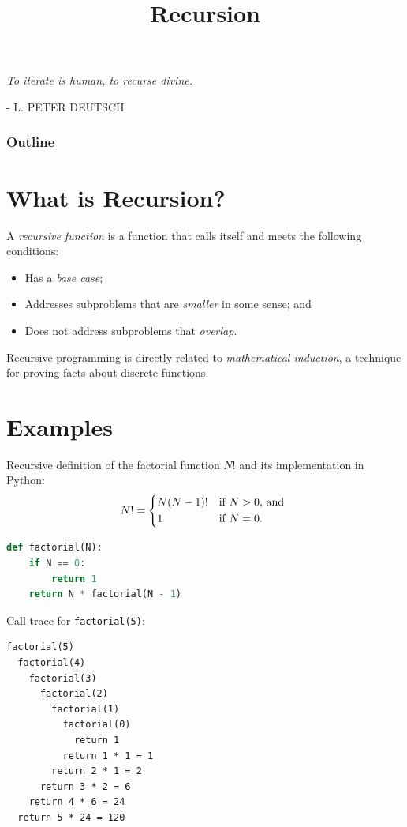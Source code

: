 \documentclass[8pt,a4paper,compress,handout]{beamer}
\title{Recursion}
\date{}
\begin{document}
\begin{frame}
\hfill
\begin{minipage}{150pt}
\begin{flushright}
\tiny \emph{To iterate is human, to recurse divine.}

\smallskip

- L. PETER DEUTSCH
\end{flushright}
\end{minipage}
\vfill
\titlepage
\end{frame}

\begin{frame}
\frametitle{Outline}
\tableofcontents
\end{frame}

\section{What is Recursion?}
\begin{frame}[fragile]
A \emph{recursive function} is a function that calls itself and meets the following conditions:
\begin{itemize}
\item Has a \emph{base case}; 
\item Addresses subproblems that are \emph{smaller} in some sense; and
\item Does not address subproblems that \emph{overlap}.
\end{itemize}

\bigskip

Recursive programming is directly related to \emph{mathematical induction}, a technique for proving facts about discrete functions.
\end{frame}

\section{Examples}
\begin{frame}[fragile]
Recursive definition of the factorial function $N!$ and its implementation in Python: 
\[
N! = \begin{dcases*}
N(N-1)! & if $N > 0$, and \\
1       & if $N=0$.
\end{dcases*}
\]

\begin{lstlisting}[language=Python]
def factorial(N):
    if N == 0:
        return 1
    return N * factorial(N - 1)
\end{lstlisting}

\bigskip

Call trace for \lstinline{factorial(5)}:
\begin{lstlisting}[language={}]
factorial(5)
  factorial(4)
    factorial(3)
      factorial(2)
        factorial(1)
          factorial(0)
            return 1
          return 1 * 1 = 1            
        return 2 * 1 = 2
      return 3 * 2 = 6
    return 4 * 6 = 24
  return 5 * 24 = 120
\end{lstlisting}
\end{frame}
\end{document}
